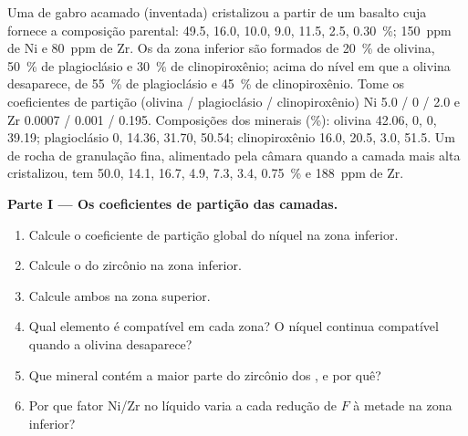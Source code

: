 \begin{problem}
\label{pb:b2:magmatic-differentiation:1}
Uma  de gabro acamado (inventada) cristalizou a partir de um basalto cuja 
fornece a composição parental:  49.5,  16.0,  10.0,
 9.0,  11.5,  2.5,  \qty{0.30}{\percent};
\qty{150}{ppm} de Ni e \qty{80}{ppm} de Zr. Os  da zona inferior são formados de
\qty{20}{\percent} de olivina, \qty{50}{\percent} de plagioclásio e \qty{30}{\percent} de
clinopiroxênio; acima do nível em que a olivina desaparece, de \qty{55}{\percent} de
plagioclásio e \qty{45}{\percent} de clinopiroxênio. Tome os coeficientes de partição
(olivina / plagioclásio / clinopiroxênio) Ni 5.0 / 0 / 2.0 e Zr 0.0007 / 0.001 /
0.195. Composições dos minerais (\unit{\percent}): olivina  42.06,  0,
 0,  39.19; plagioclásio 0, 14.36, 31.70, 50.54; clinopiroxênio
16.0, 20.5, 3.0, 51.5. Um 
de rocha de granulação fina, alimentado pela câmara quando a camada mais alta cristalizou, tem
 50.0,  14.1,  16.7,  4.9,  7.3,
 3.4,  \qty{0.75}{\percent} e \qty{188}{ppm} de Zr.

\noindent\textbf{Parte I --- Os coeficientes de partição das camadas.}
\begin{enumerate}
\item Calcule o coeficiente de partição global do níquel na zona inferior.
\item Calcule o do zircônio na zona inferior.
\item Calcule ambos na zona superior.
\item Qual elemento é compatível em cada zona? O níquel continua compatível quando
a olivina desaparece?
\item Que mineral contém a maior parte do zircônio dos , e por quê?
\item Por que fator Ni/Zr no líquido varia a cada redução de $F$ à metade na zona
inferior?
\end{enumerate}


\end{problem}
